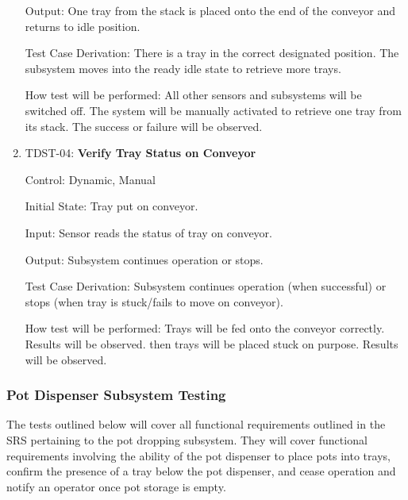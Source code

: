 \documentclass[12pt, titlepage]{article}
\begin{document}
\begin{enumerate}
  Output: One tray from the stack is placed onto the end of the conveyor and returns to idle position.
  
  Test Case Derivation: There is a tray in the correct designated position.
  The subsystem moves into the ready idle state to retrieve more trays.
            
  How test will be performed: All other sensors and subsystems will be switched off. 
  The system will be manually activated to retrieve one tray from its stack.
  The success or failure will be observed.
\\
  \item{TDST-04: \textbf{Verify Tray Status on Conveyor}}
  
  Control: Dynamic, Manual
            
  Initial State: Tray put on conveyor.
            
  Input: Sensor reads the status of tray on conveyor.
            
  Output: Subsystem continues operation or stops.
  
  Test Case Derivation: Subsystem continues operation (when successful) or stops (when tray is stuck/fails to move on conveyor).
  
  How test will be performed: Trays will be fed onto the conveyor correctly. Results will be observed.
  then trays will be placed stuck on purpose. Results will be observed.
  
  \end{enumerate}

\subsubsection{Pot Dispenser Subsystem Testing}

The tests outlined below will cover all functional requirements outlined in the SRS
pertaining to the pot dropping subsystem. They will cover functional requirements involving
the ability of the pot dispenser to place pots into trays, confirm the presence of a tray below the
pot dispenser, and cease operation and notify an operator once pot storage is empty.\\
\end{document}
